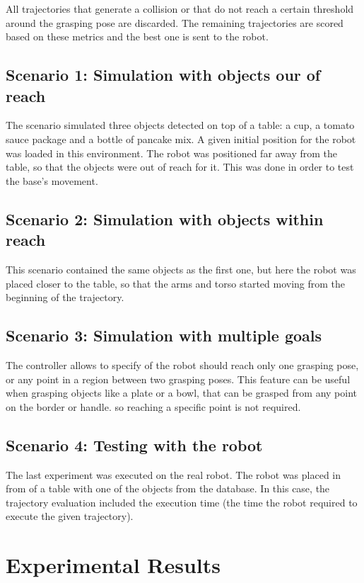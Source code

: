 All trajectories that generate a collision or that do not reach a certain threshold around the grasping pose are discarded. The remaining trajectories are scored based on these metrics and the best one is sent to the robot.

\subsection{Scenario 1: Simulation with objects our of reach}

The scenario simulated three objects detected on top of a table: a cup, a tomato sauce package and a bottle of pancake mix. A given initial position for the robot was loaded in this environment. The robot was positioned far away from the table, so that the objects were out of reach for it. This was done in order to test the base's movement.

\subsection{Scenario 2: Simulation with objects within reach}

This scenario contained the same objects as the first one, but here the robot was placed closer to the table, so that the arms and torso started moving from the beginning of the trajectory.

\subsection{Scenario 3: Simulation with multiple goals}

The controller allows to specify of the robot should reach only one grasping pose, or any point in a region between two grasping poses. This feature can be useful when grasping objects like a plate or a bowl, that can be grasped from any point on the border or handle. so reaching a specific point is not required.

\subsection{Scenario 4: Testing with the robot}

The last experiment was executed on the real robot. The robot was placed in from of a table with one of the objects from the database. In this case, the trajectory evaluation included the execution time (the time the robot required to execute the given trajectory).

\section{Experimental Results}

